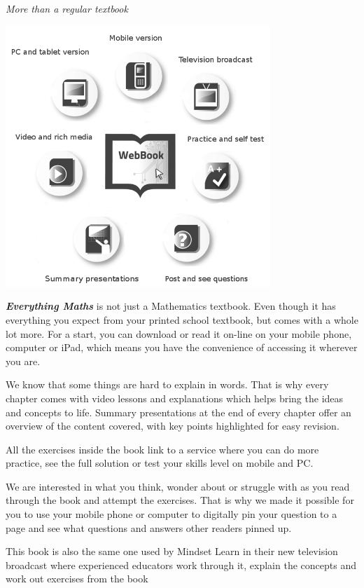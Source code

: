
\newpage
\thispagestyle{empty}

{\normalfont\sffamily\fontsize{22}\normalfont\itshape More than a regular textbook} \par

\begin{center}
\includegraphics[width=0.75\textwidth]{title_images/morethantextbook.png}
\end{center}

\par
{\Large
\textbf{\textit{Everything Maths}} is not just a Mathematics textbook. Even though it has everything you expect from
your printed school textbook, but comes with a whole lot more. For a start, you can download or read it
on-line on your mobile phone, computer or iPad, which means you have the convenience of accessing
it wherever you are.\par


We know that some things are hard to explain in words. That is why every chapter comes with video
lessons and explanations which helps bring the ideas and concepts to life. Summary presentations at
the end of every chapter offer an overview of the content covered, with key points highlighted for easy
revision.\par


All the exercises inside the book link to a service where you can do more practice, see the full solution
or test your skills level on mobile and PC.\par


We are interested in what you think, wonder about or struggle with as you read through the book and
attempt the exercises. That is why we made it possible for you to use your mobile phone or computer to
digitally pin your question to a page and see what questions and answers other readers pinned up.\par


This book is also the same one used by Mindset Learn in their new television broadcast where
experienced educators work through it, explain the concepts and work out exercises from the book
}




